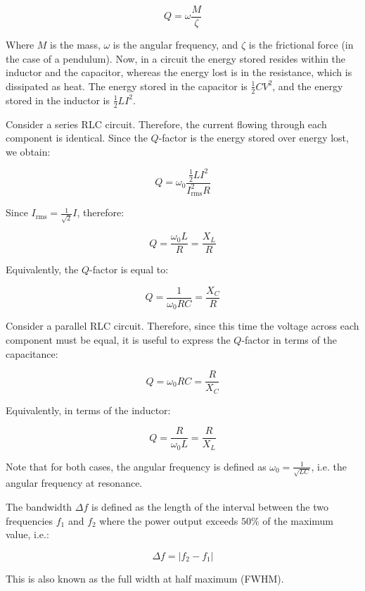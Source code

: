 \documentclass{article}
\begin{document}
\[ Q = \omega\frac{M}{\zeta} \]

Where $M$ is the mass, $\omega$ is the angular frequency, and $\zeta$ is the frictional force (in the case of a pendulum). Now, in a circuit the energy stored resides within the inductor and the capacitor, whereas the energy lost is in the resistance, which is dissipated as heat. The energy stored in the capacitor is $\frac{1}{2}CV^2$, and the energy stored in the inductor is $\frac{1}{2}LI^2$.

\begin{proposition}
    Consider a series RLC circuit. Therefore, the current flowing through each component is identical. Since the $Q$-factor is the energy stored over energy lost, we obtain:

    \[ Q = \omega_0\frac{\frac{1}{2}LI^2}{I_{\text{rms}}^2R} \]

    Since $I_{\text{rms}} = \frac{1}{\sqrt{2}}I$, therefore:

    \[ Q = \frac{\omega_0L}{R} = \frac{X_L}{R} \]

    Equivalently, the $Q$-factor is equal to:

    \[ Q = \frac{1}{\omega_0RC} = \frac{X_C}{R} \]
\end{proposition}

\begin{proposition}
    Consider a parallel RLC circuit. Therefore, since this time the voltage across each component must be equal, it is useful to express the $Q$-factor in terms of the capacitance:

    \[ Q = \omega_0RC = \frac{R}{X_C} \]

    Equivalently, in terms of the inductor:

    \[ Q = \frac{R}{\omega_0L} = \frac{R}{X_L} \]
\end{proposition}

Note that for both cases, the angular frequency is defined as $\omega_0 = \frac{1}{\sqrt{LC}}$, i.e. the angular frequency at resonance.

\begin{definition}[Bandwidth]
    The bandwidth $\Delta f$ is defined as the length of the interval between the two frequencies $f_1$ and $f_2$ where the power output exceeds $50\%$ of the maximum value, i.e.:

    \[ \Delta f = |f_2 - f_1| \]

    This is also known as the full width at half maximum (FWHM).
\end{definition}
\end{document}
